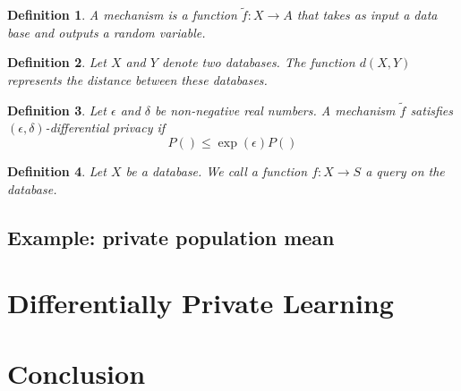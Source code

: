 \documentclass{icopust}
\newtheorem{defn}{Definition}
\begin{document}
\begin{defn}
    A \emph{mechanism} is a function $\tilde f : X \to A$ that takes as input a data base and outputs a random variable.
\end{defn}

\begin{defn}
    Let $X$ and $Y$ denote two databases.
    The function $d(X,Y)$ represents the distance between these databases.
\end{defn}

\begin{defn}
    Let $\epsilon$ and $\delta$ be non-negative real numbers.
    A mechanism $\tilde f$ satisfies $(\epsilon,\delta)$-\emph{differential privacy} if
    \begin{equation}
        P() \le \exp(\epsilon)P()
    \end{equation}
\end{defn}

\begin{defn}
    Let $X$ be a database.
    We call a function $f : X \to S$ a \emph{query} on the database.
\end{defn}

\subsection{Example: private population mean}

\section{Differentially Private Learning}



\section{Conclusion}


\clearpage



\end{document}

